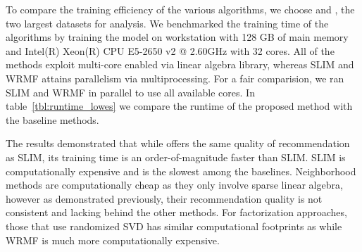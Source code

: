 To compare the training efficiency of the various algorithms, we choose \Lowes and \MLens, the two largest datasets for analysis.
We benchmarked the training time of the algorithms 
by training the model on  workstation with 128 GB of main memory and Intel(R) Xeon(R) CPU E5-2650 v2 @ 2.60GHz with 32 cores. All of the methods exploit multi-core enabled via linear algebra library, whereas SLIM and WRMF attains parallelism via multiprocessing. For a fair comparision, we ran  SLIM and WRMF in parallel to use all available cores.  In table~\ref{tbl:runtime_lowes} we compare the runtime of the proposed method with the baseline methods. 

The results demonstrated that while \LinearLow offers the same quality of recommendation as SLIM, its training time is an order-of-magnitude 
faster than SLIM.  SLIM is computationally expensive and is the slowest among the baselines. 
Neighborhood methods are computationally cheap as they only involve sparse linear algebra, however as demonstrated previously, their recommendation
quality is not consistent and lacking behind the other methods. 
For factorization approaches, those that use randomized SVD has similar computational footprints as \LinearLow while
WRMF is much more computationally expensive.




\begin{table}
\caption{Training time on the  \Lowes  and \MLens Dataset.}
\label{tbl:runtime_lowes}
\centering
{}

\end{table}
